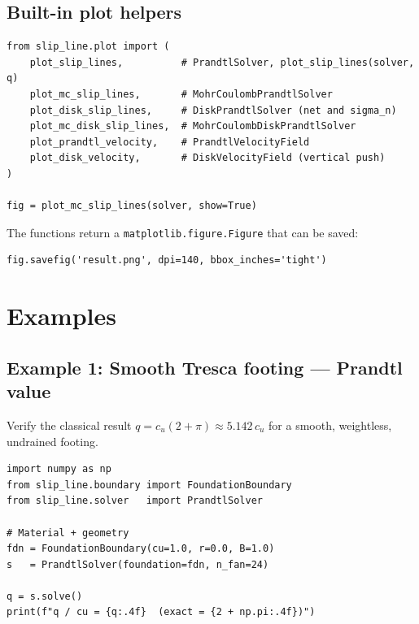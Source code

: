 \documentclass[11pt,a4paper]{article}
\begin{document}
\subsection{Built-in plot helpers}

\begin{lstlisting}
from slip_line.plot import (
    plot_slip_lines,          # PrandtlSolver, plot_slip_lines(solver, q)
    plot_mc_slip_lines,       # MohrCoulombPrandtlSolver
    plot_disk_slip_lines,     # DiskPrandtlSolver (net and sigma_n)
    plot_mc_disk_slip_lines,  # MohrCoulombDiskPrandtlSolver
    plot_prandtl_velocity,    # PrandtlVelocityField
    plot_disk_velocity,       # DiskVelocityField (vertical push)
)

fig = plot_mc_slip_lines(solver, show=True)
\end{lstlisting}

The functions return a \texttt{matplotlib.figure.Figure} that can be
saved:
\begin{lstlisting}
fig.savefig('result.png', dpi=140, bbox_inches='tight')
\end{lstlisting}

\section{Examples}
\label{sec:examples}

\subsection{Example 1: Smooth Tresca footing — Prandtl value}
\label{ex:tresca}

Verify the classical result $q = c_u(2+\pi) \approx 5.142\,c_u$ for a
smooth, weightless, undrained footing.

\begin{lstlisting}
import numpy as np
from slip_line.boundary import FoundationBoundary
from slip_line.solver   import PrandtlSolver

# Material + geometry
fdn = FoundationBoundary(cu=1.0, r=0.0, B=1.0)
s   = PrandtlSolver(foundation=fdn, n_fan=24)

q = s.solve()
print(f"q / cu = {q:.4f}  (exact = {2 + np.pi:.4f})")
\end{lstlisting}
\end{document}
